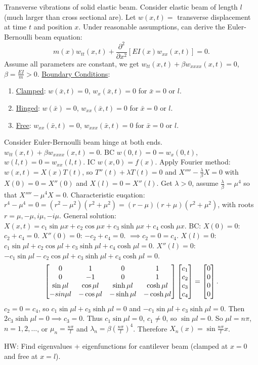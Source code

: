\documentclass[]{article}
\begin{document}
\newpage

Transverse vibrations of solid elastic beam.
Consider elastic beam of length $l$ (much larger than cross sectional are). Let $w(x,t) = $ transverse displacement at time $t$ and position $x$. Under reasonable assumptions, can derive the Euler-Bernoulli beam equation: $$ m(x) w_{tt}(x,t) + \frac{\partial^2}{\partial x^2} [EI(x)w_{xx}(x,t)] = 0. $$
Assume all parameters are constant, we get $ w_{tt}(x,t) + \beta w_{xxxx} (x,t) = 0$, $\beta = \frac{EI}{m} > 0$.
\underline{Boundary Conditions}:
\begin{enumerate}
	\item[]\underline{Clamped}: $w(\bar{x},t) = 0$, $w_x(\bar{x},t) = 0$ for $\bar{x} = 0$ or $l$.
	\item[]\underline{Hinged}: $w(\bar{x}) = 0$, $w_{xx}(\bar{x},t) = 0$ for $\bar{x} = 0$ or $l$.
	\item[]\underline{Free}: $w_{xx}(\bar{x},t) = 0$, $w_{xxx}(\bar{x},t) = 0$ for $\bar{x} = 0$ or $l$.
\end{enumerate}
\begin{example}
	Consider Euler-Bernoulli beam hinge at both ends. $w_{tt}(x,t) + \beta w_{xxxx} (x,t) = 0$. BC $w(0,t) = 0 = w_x(0,t)$, $w(l,t) = 0 = w_{xx}(l,t)$. IC $w(x,0) = f(x)$.
	Apply Fourier method: $w(x,t) = X(x) T(t)$, so $T''(t) + \lambda T(t) = 0$ and $X'''' - \frac{\lambda}{\beta} X = 0$ with $X(0) = 0 = X''(0)$ and $X(l) = 0 = X''(l)$. Get $\lambda>0$, assume $\frac{\lambda}{\beta} = \mu^4$ so that $X'''' - \mu^4 X = 0$. Characteristic euqation: $r^4 - \mu^4 = 0 = (r^2 - \mu^2)(r^2+\mu^2) = (r-\mu)(r+\mu)(r^2+\mu^2)$, with roots $r=\mu,-\mu,i\mu,-i\mu$.
	General solution: $X(x,t) = c_1 \sin{\mu x} + c_2\cos{\mu x} + c_3 \sinh{\mu x} + c_4 \cosh{\mu x}$. BC: $X(0) = 0$: $c_2 + c_4 = 0$. $X''(0) = 0$: $-c_2+c_4 = 0$. $\implies c_2 = 0 = c_4$. $X(l) = 0$: $c_1\sin{\mu l} + c_2 \cos{\mu l} + c_3 \sinh{\mu l} + c_4 \cosh{\mu l} = 0$. $X''(l) = 0$: $-c_1\sin{\mu l} - c_2 \cos{\mu l} + c_3 \sinh{\mu l} + c_4 \cosh{\mu l} = 0$.
	$$\begin{bmatrix} 0 & 1 & 0 & 1 \\ 0 & -1 & 0 & 1 \\ \sin{\mu l} & \cos{\mu l} & \sinh{\mu l} & \cosh{\mu l} \\ -sin{\mu l} & -\cos{\mu l} & -\sinh{\mu l} & -\cosh{\mu l}\end{bmatrix} \begin{bmatrix} c_1 \\ c_2 \\ c_3 \\ c_4\end{bmatrix} = \begin{bmatrix}0\\0\\0\\0\end{bmatrix}. $$
	$c_2 = 0 = c_4$, so $c_1 \sin{\mu l} + c_3 \sinh{\mu l} = 0$ and $-c_1 \sin{\mu l} + c_3 \sinh{\mu l} = 0$. Then $2c_3 \sinh{\mu l} = 0 \implies c_3 = 0$. Thus $c_1\sin{\mu l} = 0$, $c_1 \neq 0$, so $\sin{\mu l} = 0$. So $\mu l = n\pi$, $n = 1,2,\dots$, or $\mu_n = \frac{n\pi}{l}$ and $\lambda_n = \beta \left(\frac{n\pi}{l}\right)^4$. Therefore $X_n(x) = \sin{\frac{n\pi}{l}x}$.
\end{example}
HW: Find eigenvalues + eigenfunctions for cantilever beam (clamped at $x=0$ and free at $x=l$).
\end{document}
